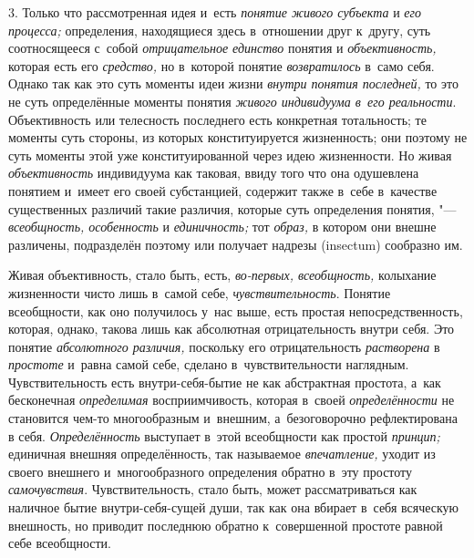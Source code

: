 3. Только что рассмотренная идея и~есть {\em понятие живого субъекта}
и {\em его процесса;} определения, находящиеся здесь в~отношении друг к~другу,
суть соотносящееся с~собой {\em отрицательное единство} понятия и
{\em объективность,} которая есть его {\em средство,} но в~которой понятие
{\em возвратилось} в~само себя. Однако так как это суть моменты идеи жизни
{\em внутри понятия последней,} то это не суть определённые моменты понятия
{\em живого индивидуума в~его реальности}.
Объективность или телесность последнего есть
конкретная тотальность; те моменты суть стороны, из которых конституируется
жизненность; они поэтому не суть моменты этой уже конституированной через
идею жизненности. Но живая {\em объективность}
индивидуума как таковая, ввиду того что она одушевлена
понятием и~имеет его своей субстанцией, содержит также в~себе в~качестве
существенных различий такие различия, которые суть определения понятия, "---
{\em всеобщность, особенность} и {\em единичность;} тот {\em образ,}
в котором они внешне различены, подразделён поэтому или
получает надрезы (insectum) сообразно
им.

Живая объективность, стало быть, есть, {\em во-первых, всеобщность,}
колыхание жизненности чисто лишь в~самой себе, {\em чувствительность}.
Понятие всеобщности, как оно получилось у~нас выше, есть
простая непосредственность, которая, однако, такова лишь как абсолютная
отрицательность внутри себя. Это понятие {\em абсолютного различия,}
поскольку его отрицательность {\em растворена} в {\em простоте} и~равна
самой себе, сделано в~чувствительности наглядным. Чувствительность есть
внутри-себя-бытие не как абстрактная простота, а~как бесконечная
{\em определимая} восприимчивость, которая в~своей {\em определённости} не
становится чем-то многообразным и~внешним, а~безоговорочно рефлектирована в
себя. {\em Определённость} выступает в~этой всеобщности как простой
{\em принцип;} единичная внешняя определённость, так называемое
{\em впечатление,} уходит из своего внешнего и~многообразного определения
обратно в~эту простоту {\em самочувствия}.
Чувствительность, стало быть, может рассматриваться как
наличное бытие внутри-себя-сущей души, так как она вбирает в~себя всяческую
внешность, но приводит последнюю обратно к~совершенной простоте равной себе
всеобщности.

